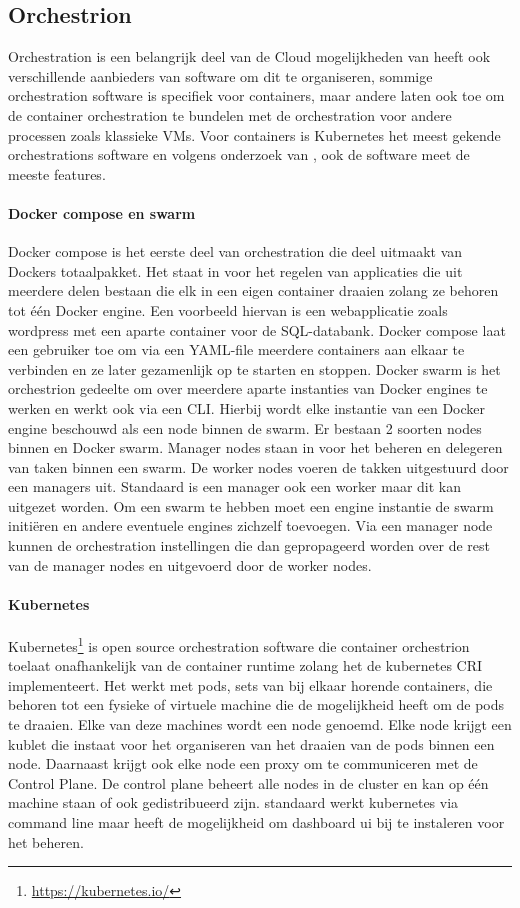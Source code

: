 \subsection{Orchestrion}
Orchestration is een belangrijk deel van de Cloud mogelijkheden van heeft ook verschillende aanbieders van software om dit te organiseren, sommige orchestration software is specifiek voor containers, maar andere laten ook toe om de container orchestration te bundelen met de orchestration voor andere processen zoals klassieke VMs. Voor containers is Kubernetes het meest gekende orchestrations software en volgens onderzoek van \textcite{Truyen2019}, ook de software meet de meeste features.  
\paragraph{Docker compose en swarm}
Docker compose is het eerste deel van orchestration die deel uitmaakt van Dockers totaalpakket. Het staat in voor het regelen van applicaties die uit meerdere delen bestaan die elk in een eigen container draaien zolang ze behoren tot één Docker engine. Een voorbeeld hiervan is een webapplicatie zoals wordpress met een aparte container voor de SQL-databank.  Docker compose laat een gebruiker toe om via een YAML-file meerdere containers aan elkaar te verbinden en ze later gezamenlijk op te starten en stoppen.
Docker swarm is het orchestrion gedeelte om over meerdere aparte instanties van Docker engines te werken en werkt ook via een CLI. Hierbij wordt elke instantie van een Docker engine beschouwd als een node binnen de swarm. Er bestaan 2 soorten nodes binnen en Docker swarm. Manager nodes staan in voor het beheren en delegeren van taken binnen een swarm. De worker nodes voeren de takken uitgestuurd door een managers uit. Standaard is een manager ook een worker maar dit kan uitgezet worden. Om een swarm te hebben moet een engine instantie de swarm initiëren en andere eventuele engines zichzelf toevoegen. Via een manager node kunnen de orchestration instellingen die dan gepropageerd worden over de rest van de manager nodes en uitgevoerd door de worker nodes.
\paragraph{Kubernetes}
Kubernetes\footnote{\url{https://kubernetes.io/}} is open source orchestration software die container orchestrion toelaat onafhankelijk van de container runtime zolang het de kubernetes CRI implementeert. Het werkt met pods,  sets van bij elkaar horende containers, die behoren tot een fysieke of virtuele machine die de mogelijkheid heeft om de pods te draaien. Elke van deze machines wordt een node genoemd. Elke node krijgt een kublet die instaat voor het organiseren van het draaien van de pods binnen een node. Daarnaast krijgt ook elke node een proxy om te communiceren met de Control Plane. De control plane beheert alle nodes in de cluster en kan op één machine staan of ook gedistribueerd zijn.  standaard werkt kubernetes via command line maar heeft de mogelijkheid om dashboard ui bij te instaleren voor het beheren.

